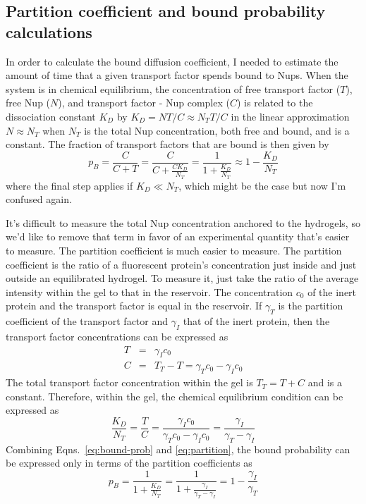 \subsection{Partition coefficient and bound probability calculations}
\label{sec:part-coeff}
In order to calculate the bound diffusion coefficient, I needed to estimate the amount of time that a given transport factor spends bound to Nups.  When the system is in chemical equilibrium, the concentration of free transport factor ($T$), free Nup ($N$), and transport factor - Nup complex ($C$) is related to the dissociation constant $K_D$ by
$K_D = NT/C \approx N_TT/C$ in the linear approximation $N \approx N_T$ when $N_T$ is the total Nup concentration, both free and bound, and is a constant.  The fraction of transport factors that are bound is then given by
\begin{equation}
p_B = \frac{C}{C+T} = \frac{C}{C+\frac{CK_D}{N_T}} = \frac{1}{1+\frac{K_D}{N_T}} \approx 1 - \frac{K_D}{N_T}
\label{eq:bound-prob}
\end{equation} where the final step applies if $K_D \ll N_T$, which might be the case but now I'm confused again.

It's difficult to measure the total Nup concentration anchored to the hydrogels, so we'd like to remove that term in favor of an experimental quantity that's easier to measure.  The partition coefficient is much easier to measure.  The partition coefficient is the ratio of a fluorescent protein's concentration just inside and just outside an equilibrated hydrogel.  To measure it, just take the ratio of the average intensity within the gel to that in the reservoir.  The concentration $c_0$ of the inert protein and the transport factor is equal in the reservoir.  If $\gamma_T$ is the partition coefficient of the transport factor and $\gamma_I$ that of the inert protein, then the transport factor concentrations can be expressed as
\begin{eqnarray}
T &=& \gamma_I c_0\\
C & =& T_T - T = \gamma_Tc_0 - \gamma_I c_0
\label{eq:gamma}
\end{eqnarray} 
The total transport factor concentration within the gel is $T_T = T + C$ and is a constant.
Therefore, within the gel, the chemical equilibrium condition can be expressed as
\begin{equation}
\frac{K_D}{N_T} = \frac{T}{C} = \frac{\gamma_I c_0}{\gamma_T c_0 - \gamma_I c_0} = \frac{\gamma_I}{\gamma_T - \gamma_I}
\label{eq:partition}
\end{equation}
Combining Eqns.~\ref{eq:bound-prob} and \ref{eq:partition}, the bound probability can be expressed only in terms of the partition coefficients as
\begin{equation}
p_B= \frac{1}{1+\frac{K_D}{N_T}} = \frac{1}{1+\frac{\gamma_I}{\gamma_T - \gamma_I}} = 1 - \frac{\gamma_I}{\gamma_T}
\label{eq:bound-prob-final}
\end{equation}

